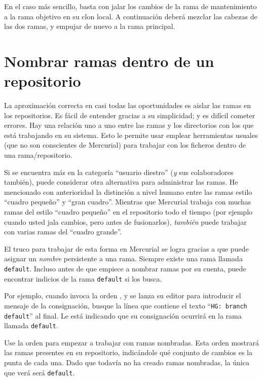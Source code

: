 En el caso más sencillo, basta con jalar los cambios de la rama de
mantenimiento a la rama objetivo en su clon local.
A continuación deberá mezclar las cabezas de las dos ramas, y empujar
de nuevo a la rama principal.

\section{Nombrar ramas dentro de un repositorio}

La aproximación correcta en casi todas las oportunidades es aislar las
ramas en los repositorios.  Es fácil de entender gracias a su
simplicidad; y es difícil cometer errores. Hay una relación uno a uno
entre las ramas y los directorios con los que está trabajando en su
sistema. Esto le permite usar emplear herramientas usuales (que no son
conscientes de Mercurial) para trabajar con los ficheros dentro de una
rama/repositorio.

Si se encuentra más en la categoría ``usuario diestro'' (\emph{y} sus
colaboradores también), puede considerar otra alternativa para
administrar las ramas. He mencionado con anterioridad la distinción a
nivel humano entre las ramas estilo ``cuadro pequeño'' y ``gran
cuadro''.  Mientras que Mercurial trabaja con muchas ramas del estilo
``cuadro pequeño'' en el repositorio todo el tiempo (por ejemplo cuando
usted jala cambios, pero antes de fusionarlos), \emph{también} puede
trabajar con varias ramas del ``cuadro grande''.

El truco para trabajar de esta forma en Mercurial se logra gracias a
que puede asignar un \emph{nombre} persistente a una rama.  Siempre
existe una rama llamada \texttt{default}.  Incluso antes de que
empiece a nombrar ramas por su cuenta, puede encontrar indicios de la
rama \texttt{default} si los busca.

Por ejemplo, cuando invoca la orden , y se lanza su
editor para introducir el mensaje de la consignación, busque la línea
que contiene el texto ``\texttt{HG: branch default}'' al final. Le
está indicando que su consignación ocurrirá en la rama llamada 
\texttt{default}.

Use la orden  para empezar a trabajar con ramas
nombradas. Esta orden mostrará las ramas presentes en su repositorio,
indicándole qué conjunto de cambios es la punta de cada una.
Dado que todavía no ha creado ramas nombradas, la única que verá será
\texttt{default}.

